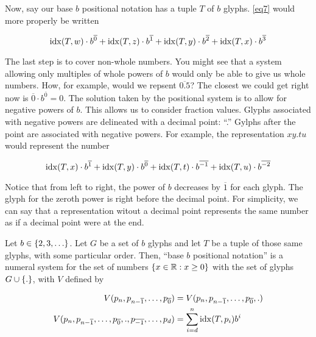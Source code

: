 \documentclass{article}
\begin{document}
	Now, say our base $b$ positional notation has a tuple $T$ of $b$ glyphs. \ref{eq7} would more properly be written
	
	\begin{equation}\label{eq10}
		\operatorname{idx}(T, w)\cdot b^{\overline{0}} + \operatorname{idx}(T, z)\cdot b^{\overline{1}} + \operatorname{idx}(T, y)\cdot b^{\overline{2}} + \operatorname{idx}(T, x)\cdot b^{\overline{3}}
	\end{equation}
	
	The last step is to cover non-whole numbers. You might see that a system allowing only multiples of whole powers of $b$ would only be able to give us whole numbers. How, for example, would we repsent $\overline{0.5}$? The closest we could get right now is $\overline{0}\cdot b^{\overline{0}} = 0$. The solution taken by the positional system is to allow for negative powers of $b$. This allows us to consider fraction values. Glyphs associated with negative powers are delineated with a decimal point: ``.''  Gylphs after the point are associated with negative powers. For example, the representation $xy.tu$ would represent the number
	
	\begin{equation}\label{eq11}
		\operatorname{idx}(T, x)\cdot b^{\overline{1}} + \operatorname{idx}(T, y)\cdot b^{\overline{0}} + \operatorname{idx}(T, t)\cdot b^{\overline{-1}} + \operatorname{idx}(T, u)\cdot b^{\overline{-2}}
	\end{equation}
	
	Notice that from left to right, the power of $b$ decreases by $\overline{1}$ for each glyph. The glyph for the zeroth power is right before the decimal point. For simplicity, we can say that a representation witout a decimal point represents the same number as if a decimal point were at the end.
	
	\begin{definition}
		Let $b\in \Bqty{2, 3, \dots}$. Let $G$ be a set of $b$ glyphs and let $T$ be a tuple of those same glyphs, with some particular order. Then, ``base $b$ positional notation'' is  a numeral system for the set of numbers $\Bqty{x\in\R : x\geq 0}$ with the set of glyphs $G\cup \Bqty{.}$, with $V$ defined by
		
		\begin{equation}\label{eq12}
			\begin{split}
				V(p_{n}, p_{n-\overline{1}}, \dots, p_{\overline{0}})&=V(p_{n}, p_{n-\overline{1}}, \dots, p_{\overline{0}}, .)\\
				V(p_{n}, p_{n-\overline{1}}, \dots, p_{\overline{0}}, ., p_{\overline{-1}}, \dots, p_{d}) &= \sum_{i=d}^{n}\operatorname{idx}(T, p_i)b^i
			\end{split}
		\end{equation}
	\end{definition}
	
\end{document}
